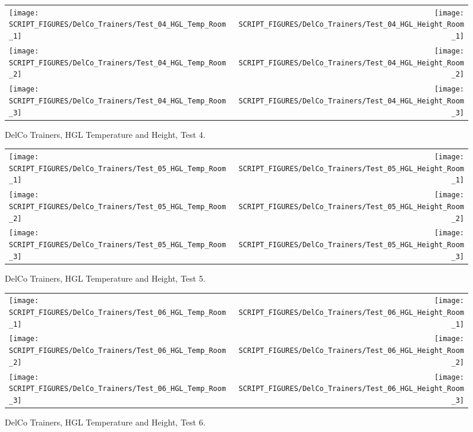 \begin{figure}[p]
\begin{tabular*}{\textwidth}{l@{\extracolsep{\fill}}r}
\texttt{[image: SCRIPT\_FIGURES/DelCo\_Trainers/Test\_04\_HGL\_Temp\_Room\_1]} &
\texttt{[image: SCRIPT\_FIGURES/DelCo\_Trainers/Test\_04\_HGL\_Height\_Room\_1]} \\
\texttt{[image: SCRIPT\_FIGURES/DelCo\_Trainers/Test\_04\_HGL\_Temp\_Room\_2]} &
\texttt{[image: SCRIPT\_FIGURES/DelCo\_Trainers/Test\_04\_HGL\_Height\_Room\_2]} \\
\texttt{[image: SCRIPT\_FIGURES/DelCo\_Trainers/Test\_04\_HGL\_Temp\_Room\_3]} &
\texttt{[image: SCRIPT\_FIGURES/DelCo\_Trainers/Test\_04\_HGL\_Height\_Room\_3]}
\end{tabular*}
\caption[DelCo Trainers, HGL Temperature and Height, Test 4]
{DelCo Trainers, HGL Temperature and Height, Test 4.}
\label{DelCo_HGL_4}
\end{figure}

\begin{figure}[p]
\begin{tabular*}{\textwidth}{l@{\extracolsep{\fill}}r}
\texttt{[image: SCRIPT\_FIGURES/DelCo\_Trainers/Test\_05\_HGL\_Temp\_Room\_1]} &
\texttt{[image: SCRIPT\_FIGURES/DelCo\_Trainers/Test\_05\_HGL\_Height\_Room\_1]} \\
\texttt{[image: SCRIPT\_FIGURES/DelCo\_Trainers/Test\_05\_HGL\_Temp\_Room\_2]} &
\texttt{[image: SCRIPT\_FIGURES/DelCo\_Trainers/Test\_05\_HGL\_Height\_Room\_2]} \\
\texttt{[image: SCRIPT\_FIGURES/DelCo\_Trainers/Test\_05\_HGL\_Temp\_Room\_3]} &
\texttt{[image: SCRIPT\_FIGURES/DelCo\_Trainers/Test\_05\_HGL\_Height\_Room\_3]}
\end{tabular*}
\caption[DelCo Trainers, HGL Temperature and Height, Test 5]
{DelCo Trainers, HGL Temperature and Height, Test 5.}
\label{DelCo_HGL_5}
\end{figure}

\begin{figure}[p]
\begin{tabular*}{\textwidth}{l@{\extracolsep{\fill}}r}
\texttt{[image: SCRIPT\_FIGURES/DelCo\_Trainers/Test\_06\_HGL\_Temp\_Room\_1]} &
\texttt{[image: SCRIPT\_FIGURES/DelCo\_Trainers/Test\_06\_HGL\_Height\_Room\_1]} \\
\texttt{[image: SCRIPT\_FIGURES/DelCo\_Trainers/Test\_06\_HGL\_Temp\_Room\_2]} &
\texttt{[image: SCRIPT\_FIGURES/DelCo\_Trainers/Test\_06\_HGL\_Height\_Room\_2]} \\
\texttt{[image: SCRIPT\_FIGURES/DelCo\_Trainers/Test\_06\_HGL\_Temp\_Room\_3]} &
\texttt{[image: SCRIPT\_FIGURES/DelCo\_Trainers/Test\_06\_HGL\_Height\_Room\_3]}
\end{tabular*}
\caption[DelCo Trainers, HGL Temperature and Height, Test 6]
{DelCo Trainers, HGL Temperature and Height, Test 6.}
\label{DelCo_HGL_6}
\end{figure}


